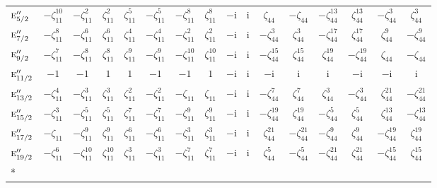 \documentclass[10pt,a4paper]{article}
\numberwithin{equation}{section}
\newcommand{\irr}[1]{\text{\normalfont\scshape #1}}
\newcommand{\iunit}{\mathrm{i}}
\newcommand{\rootunity}[1]{\zeta_{#1}}
\begin{document}
{\begin{longtable}{@{}lccccccccccccccc@{}}
$\irr{e}_{5/2}''$ & $-\rootunity{11}^{10}$ & $-\rootunity{11}^{2}$ & $\rootunity{11}^{2}$ & $\rootunity{11}^{5}$ & $-\rootunity{11}^{5}$ & $-\rootunity{11}^{8}$ & $\rootunity{11}^{8}$ & $-\iunit{}$ & $\iunit{}$ & $\rootunity{44}$ & $-\rootunity{44}$ & $-\rootunity{44}^{13}$ & $\rootunity{44}^{13}$ & $-\rootunity{44}^{3}$ & $\rootunity{44}^{3}$\\
$\irr{e}_{7/2}''$ & $-\rootunity{11}^{8}$ & $-\rootunity{11}^{6}$ & $\rootunity{11}^{6}$ & $\rootunity{11}^{4}$ & $-\rootunity{11}^{4}$ & $-\rootunity{11}^{2}$ & $\rootunity{11}^{2}$ & $-\iunit{}$ & $\iunit{}$ & $-\rootunity{44}^{3}$ & $\rootunity{44}^{3}$ & $-\rootunity{44}^{17}$ & $\rootunity{44}^{17}$ & $\rootunity{44}^{9}$ & $-\rootunity{44}^{9}$\\
$\irr{e}_{9/2}''$ & $-\rootunity{11}^{7}$ & $-\rootunity{11}^{8}$ & $\rootunity{11}^{8}$ & $\rootunity{11}^{9}$ & $-\rootunity{11}^{9}$ & $-\rootunity{11}^{10}$ & $\rootunity{11}^{10}$ & $-\iunit{}$ & $\iunit{}$ & $-\rootunity{44}^{15}$ & $\rootunity{44}^{15}$ & $\rootunity{44}^{19}$ & $-\rootunity{44}^{19}$ & $\rootunity{44}$ & $-\rootunity{44}$\\
$\irr{e}_{11/2}''$ & $-1$ & $-1$ & $1$ & $1$ & $-1$ & $-1$ & $1$ & $-\iunit{}$ & $\iunit{}$ & $-\iunit{}$ & $\iunit{}$ & $\iunit{}$ & $-\iunit{}$ & $-\iunit{}$ & $\iunit{}$\\
$\irr{e}_{13/2}''$ & $-\rootunity{11}^{4}$ & $-\rootunity{11}^{3}$ & $\rootunity{11}^{3}$ & $\rootunity{11}^{2}$ & $-\rootunity{11}^{2}$ & $-\rootunity{11}$ & $\rootunity{11}$ & $-\iunit{}$ & $\iunit{}$ & $-\rootunity{44}^{7}$ & $\rootunity{44}^{7}$ & $\rootunity{44}^{3}$ & $-\rootunity{44}^{3}$ & $\rootunity{44}^{21}$ & $-\rootunity{44}^{21}$\\
$\irr{e}_{15/2}''$ & $-\rootunity{11}^{3}$ & $-\rootunity{11}^{5}$ & $\rootunity{11}^{5}$ & $\rootunity{11}^{7}$ & $-\rootunity{11}^{7}$ & $-\rootunity{11}^{9}$ & $\rootunity{11}^{9}$ & $-\iunit{}$ & $\iunit{}$ & $-\rootunity{44}^{19}$ & $\rootunity{44}^{19}$ & $-\rootunity{44}^{5}$ & $\rootunity{44}^{5}$ & $\rootunity{44}^{13}$ & $-\rootunity{44}^{13}$\\
$\irr{e}_{17/2}''$ & $-\rootunity{11}$ & $-\rootunity{11}^{9}$ & $\rootunity{11}^{9}$ & $\rootunity{11}^{6}$ & $-\rootunity{11}^{6}$ & $-\rootunity{11}^{3}$ & $\rootunity{11}^{3}$ & $-\iunit{}$ & $\iunit{}$ & $\rootunity{44}^{21}$ & $-\rootunity{44}^{21}$ & $-\rootunity{44}^{9}$ & $\rootunity{44}^{9}$ & $-\rootunity{44}^{19}$ & $\rootunity{44}^{19}$\\
$\irr{e}_{19/2}''$ & $-\rootunity{11}^{6}$ & $-\rootunity{11}^{10}$ & $\rootunity{11}^{10}$ & $\rootunity{11}^{3}$ & $-\rootunity{11}^{3}$ & $-\rootunity{11}^{7}$ & $\rootunity{11}^{7}$ & $-\iunit{}$ & $\iunit{}$ & $\rootunity{44}^{5}$ & $-\rootunity{44}^{5}$ & $-\rootunity{44}^{21}$ & $\rootunity{44}^{21}$ & $-\rootunity{44}^{15}$ & $\rootunity{44}^{15}$\\*

\end{longtable}}
\end{document}
